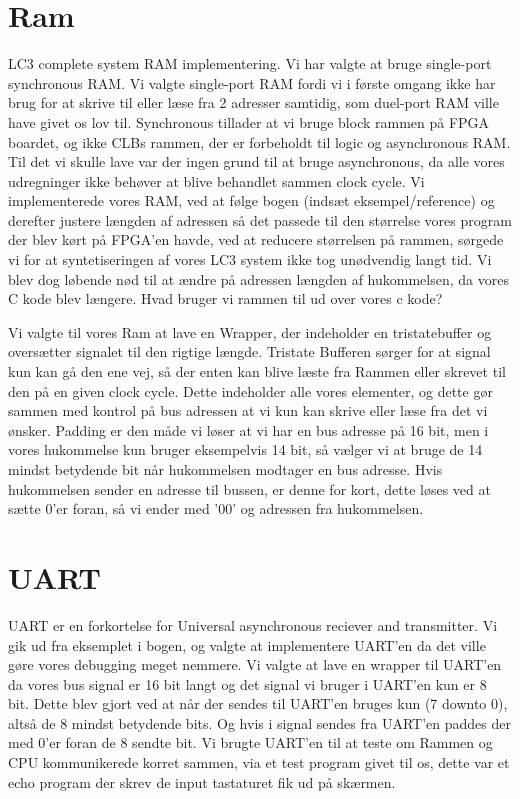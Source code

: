  \section{Ram}
 LC3 complete system RAM implementering.
Vi har valgte at bruge single-port synchronous RAM. Vi valgte single-port RAM fordi vi i første omgang ikke har brug for at skrive til eller læse fra 2 adresser samtidig, som duel-port RAM ville have givet os lov til. Synchronous tillader at vi bruge block rammen på FPGA boardet, og ikke CLBs rammen, der er forbeholdt til logic og asynchronous RAM. Til det vi skulle lave var der ingen grund til at bruge asynchronous, da alle vores udregninger ikke behøver at blive behandlet sammen clock cycle. Vi implementerede vores RAM, ved at følge bogen (indsæt eksempel/reference) og derefter justere længden af adressen så det passede til den størrelse vores program der blev kørt på FPGA'en havde, ved at reducere størrelsen på rammen, sørgede vi for at syntetiseringen af vores LC3 system ikke tog unødvendig langt tid. Vi blev dog løbende nød til at ændre på adressen længden af hukommelsen, da vores C kode blev længere. Hvad bruger vi rammen til ud over vores c kode?  

 Vi valgte til vores Ram at lave en Wrapper, der indeholder en tristatebuffer og oversætter signalet til den rigtige længde.
Tristate Bufferen sørger for at signal kun kan gå den ene vej, så der enten kan blive læste fra Rammen eller skrevet til den på en given clock cycle. Dette indeholder alle vores elementer, og dette gør sammen med kontrol på bus adressen at vi kun kan skrive eller læse fra det vi ønsker.
Padding er den måde vi løser at vi har en bus adresse på 16 bit, men i vores hukommelse kun bruger eksempelvis 14 bit, så vælger vi at bruge de 14 mindst betydende bit når hukommelsen modtager en bus adresse. Hvis hukommelsen sender en adresse til bussen, er denne for kort, dette løses ved at sætte 0'er foran, så vi ender med '00' og adressen fra hukommelsen.

\section{UART}
UART er en forkortelse for Universal asynchronous reciever and transmitter. Vi gik ud fra eksemplet i bogen, og valgte at implementere UART'en da det ville gøre vores debugging meget nemmere.  Vi valgte at lave en wrapper til UART'en da vores bus signal er 16 bit langt og det signal vi bruger i UART'en kun er 8 bit. Dette blev gjort ved at når der sendes til UART'en bruges kun (7 downto 0), altså de 8 mindst betydende bits. Og hvis i signal sendes fra UART'en paddes der med 0'er foran de 8 sendte bit. %
Vi brugte UART'en til at teste om Rammen og CPU kommunikerede korret sammen, via et test program givet til os, dette var et echo program der skrev de input tastaturet fik ud på skærmen.


